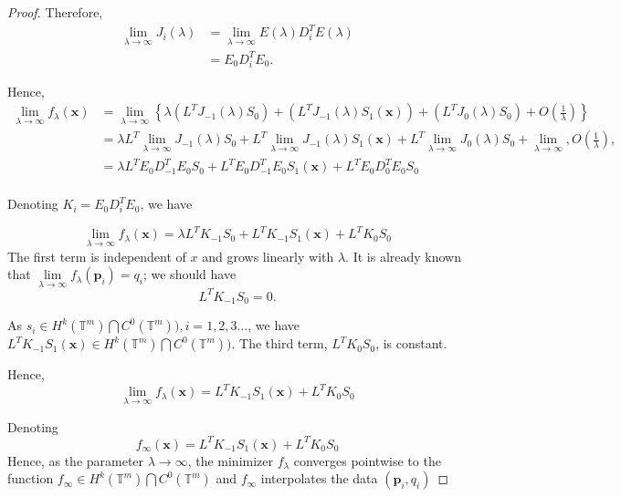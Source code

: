 \documentclass[multixcb]{amstext-l}
\theoremstyle{plain}
\theoremstyle{definition}
\theoremstyle{definition}
\theoremstyle{remark}
\numberwithin{equation}{chapter}
\begin{document}
\begin{proof}
Therefore, \begin{equation}
\begin{aligned}
    \lim\limits_{\lambda\to\infty}J_i(\lambda) &= \lim\limits_{\lambda\to\infty}E(\lambda)D_i^TE(\lambda) \\
    &= E_0D_i^TE_0.
    \end{aligned}
\end{equation}


Hence, \begin{equation}
    \begin{aligned}
        \lim\limits_{\lambda\to\infty}f_{\lambda}(\boldsymbol{x}) &= \lim\limits_{\lambda\to\infty}\left\{ \lambda\left( L^TJ_{-1}(\lambda)S_0\right) + \left(L^TJ_{-1}(\lambda)S_1(\boldsymbol{x})\right)
      + \left(L^TJ_{0}(\lambda)S_0\right) + O(\frac{1}{\lambda}) \right\} \\
     &=  \lambda L^T\lim\limits_{\lambda\to\infty}J_{-1}(\lambda) S_0 + L^T\lim\limits_{\lambda\to\infty}J_{-1}(\lambda) S_1(\boldsymbol{x}) + L^T\lim\limits_{\lambda\to\infty}J_{0}(\lambda) S_0 + \lim\limits_{\lambda\to\infty}, O(\frac{1}{\lambda}), \\
      &= \lambda L^TE_0D_{-1}^TE_0S_0 + L^TE_0D_{-1}^TE_0S_1(\boldsymbol{x}) + L^TE_0D_0^TE_0S_0 \\
    \end{aligned}
\end{equation}
 
 Denoting $K_i = E_0D_i^TE_0 $, we have
 
 \begin{equation}\label{eq64}\lim\limits_{\lambda\to\infty}f_{\lambda}(\boldsymbol{x}) = \lambda L^TK_{-1}S_0 + L^TK_{-1}S_1(\boldsymbol{x}) + L^TK_0S_0\end{equation} The first term is independent of $x$ and grows linearly with $\lambda$. It is already known that $\lim\limits_{\lambda\to\infty}f_{\lambda}(\boldsymbol{p}_i) = q_i$; we should have \begin{equation}\label{eq65} L^TK_{-1}S_0 = 0.\end{equation}

As $ s_i \in H^k(\mathbb{T}^m)\bigcap C^0(\mathbb{T}^m)), i = 1,2,3\ldots $, we have $
 L^TK_{-1}S_1(\boldsymbol{x}) \in  H^k(\mathbb{T}^m)\bigcap C^0(\mathbb{T}^m))$. The third term, $L^TK_0S_0$, is constant.
 
 Hence, \begin{equation}\label{eq66} \lim\limits_{\lambda\to\infty}f_{\lambda}(\boldsymbol{x}) = L^TK_{-1}S_1(\boldsymbol{x}) + L^TK_0S_0\end{equation}
 
 Denoting \begin{equation}
 \label{inter}
     f_{\infty}(\boldsymbol{x}) = L^TK_{-1}S_1(\boldsymbol{x}) + L^TK_0S_0
 \end{equation}
Hence, as the parameter $\lambda\to \infty$, the minimizer $f_{\lambda}$ converges pointwise to the function $f_{\infty} \in  H^k(\mathbb{T}^m)\bigcap C^0(\mathbb{T}^m)$ and $f_{\infty}$ interpolates the data $(\boldsymbol{p}_i,q_i)$
  \end{proof}
  
\end{document}
